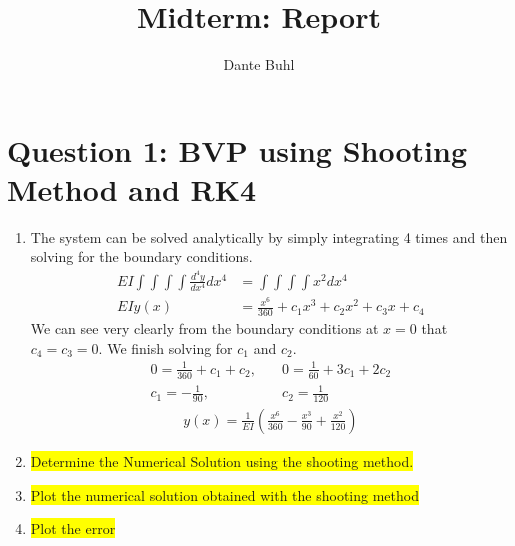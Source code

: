 \documentclass{article}
\title{Midterm: Report}
\author{Dante Buhl}
\begin{document}
\newcommand{\bs}[1]{\boldsymbol{#1}}
\newcommand{\bmp}[1]{\begin{minipage}{#1\textwidth}}
\newcommand{\emp}{\end{minipage}}
\newcommand{\R}{\mathbb{R}}
\newcommand{\C}{\mathbb{C}}
\newcommand{\N}{\mathcal{N}}
\newcommand{\I}{\mathrm{I}}
\newcommand{\K}{\bs{\mathrm{K}}}
\newcommand{\m}{\bs{\mu}_*}
\newcommand{\s}{\bs{\Sigma}_*}
\newcommand{\dt}{\Delta t}
\newcommand{\tr}[1]{\text{Tr}(#1)}
\newcommand{\Tr}[1]{\text{Tr}(#1)}
\newcommand{\hl}[1]{\colorbox{yellow}{#1}}

\maketitle

\section*{Question 1: BVP using Shooting Method and RK4}
\begin{enumerate}[label=\alph*)]

  \item The system can be solved analytically by simply integrating 4 times and
  then solving for the boundary conditions. 
  \begin{align*}
    EI\int\int\int\int \frac{d^4y}{dx^4} dx^4 &= \int\int\int\int x^2 dx^4\\
    EIy(x) &= \frac{x^6}{360} + c_1x^3 + c_2x^2 + c_3x + c_4
  \end{align*}
  We can see very clearly from the boundary conditions at $x=0$ that $c_4=c_3=0$.
  We finish solving for $c_1$ and $c_2$.
  \begin{align*}
    0 = \frac{1}{360} + c_1 + c_2, &\quad 0 = \frac{1}{60} + 3c_1 + 2c_2\\
    c_1 = -\frac{1}{90}, &\quad c_2 = \frac{1}{120}
  \end{align*}
  \begin{align*}
    y(x) = \frac{1}{EI}\left(\frac{x^6}{360} - \frac{x^3}{90} +
    \frac{x^2}{120}\right)
  \end{align*}

  \item \colorbox{yellow}{Determine the Numerical Solution using the shooting method.}


  \item \colorbox{yellow}{Plot the numerical solution obtained with the shooting
  method}

  \item \colorbox{yellow}{Plot the error}

\end{enumerate}
\end{document}

